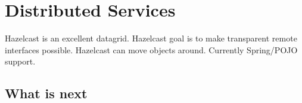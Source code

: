 \chapter{Distributed Services}
Hazelcast is an excellent datagrid. 
Hazelcast goal is to make transparent remote interfaces possible.
Hazelcast can move objects around.
Currently Spring/POJO support.






\section{What is next}

